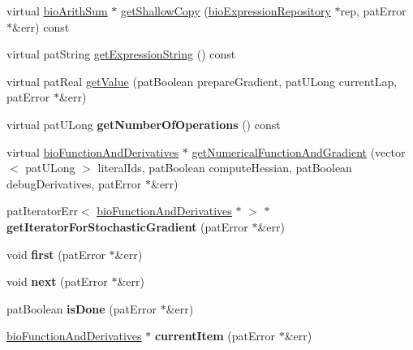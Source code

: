 \begin{DoxyCompactItemize}
\item 
virtual \hyperlink{classbio_arith_sum}{bio\+Arith\+Sum} $\ast$ \hyperlink{classbio_arith_sum_a0828ed33f49201118b143dfa336d9212}{get\+Shallow\+Copy} (\hyperlink{classbio_expression_repository}{bio\+Expression\+Repository} $\ast$rep, pat\+Error $\ast$\&err) const
\item 
virtual pat\+String \hyperlink{classbio_arith_sum_a1354d70bccf4ba5e3d8ca634005d5489}{get\+Expression\+String} () const
\item 
virtual pat\+Real \hyperlink{classbio_arith_sum_a3705cb2f1aebf4541131df5638a33379}{get\+Value} (pat\+Boolean prepare\+Gradient, pat\+U\+Long current\+Lap, pat\+Error $\ast$\&err)
\item 
\mbox{\label{classbio_arith_sum_ab192ab3a089be64024a110d94a341fb3}} 
virtual pat\+U\+Long {\bfseries get\+Number\+Of\+Operations} () const
\item 
virtual \hyperlink{classbio_function_and_derivatives}{bio\+Function\+And\+Derivatives} $\ast$ \hyperlink{classbio_arith_sum_afe9b54bab626e9dbe2b3aefebbcb6f8f}{get\+Numerical\+Function\+And\+Gradient} (vector$<$ pat\+U\+Long $>$ literal\+Ids, pat\+Boolean compute\+Hessian, pat\+Boolean debug\+Derivatives, pat\+Error $\ast$\&err)
\item 
\mbox{\label{classbio_arith_sum_a40f9c410ecce415e6f542f08d6e5cf18}} 
pat\+Iterator\+Err$<$ \hyperlink{classbio_function_and_derivatives}{bio\+Function\+And\+Derivatives} $\ast$ $>$ $\ast$ {\bfseries get\+Iterator\+For\+Stochastic\+Gradient} (pat\+Error $\ast$\&err)
\item 
\mbox{\label{classbio_arith_sum_aba70598e4a7de1d36d34c6bb693a3ebf}} 
void {\bfseries first} (pat\+Error $\ast$\&err)
\item 
\mbox{\label{classbio_arith_sum_a8f37c0eccb1fdc7f6aea57053332e438}} 
void {\bfseries next} (pat\+Error $\ast$\&err)
\item 
\mbox{\label{classbio_arith_sum_a22b293eefd5b26bdc102d2dbe938e5fd}} 
pat\+Boolean {\bfseries is\+Done} (pat\+Error $\ast$\&err)
\item 
\mbox{\label{classbio_arith_sum_adef00302e992d944a9cd48c6e4050996}} 
\hyperlink{classbio_function_and_derivatives}{bio\+Function\+And\+Derivatives} $\ast$ {\bfseries current\+Item} (pat\+Error $\ast$\&err)

\end{DoxyCompactItemize}
